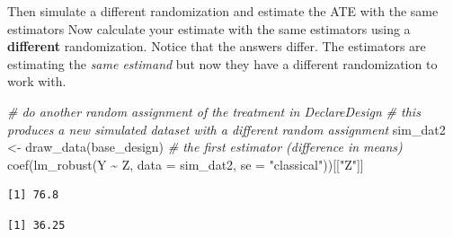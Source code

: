 \documentclass[
  ignorenonframetext,
]{beamer}
\newenvironment{Shaded}{\begin{snugshade}}{\end{snugshade}}
\newcommand{\AttributeTok}[1]{\textcolor[rgb]{0.77,0.63,0.00}{#1}}
\newcommand{\CommentTok}[1]{\textcolor[rgb]{0.56,0.35,0.01}{\textit{#1}}}
\newcommand{\DecValTok}[1]{\textcolor[rgb]{0.00,0.00,0.81}{#1}}
\newcommand{\FunctionTok}[1]{\textcolor[rgb]{0.00,0.00,0.00}{#1}}
\newcommand{\NormalTok}[1]{#1}
\newcommand{\OtherTok}[1]{\textcolor[rgb]{0.56,0.35,0.01}{#1}}
\newcommand{\SpecialCharTok}[1]{\textcolor[rgb]{0.00,0.00,0.00}{#1}}
\newcommand{\StringTok}[1]{\textcolor[rgb]{0.31,0.60,0.02}{#1}}
\begin{document}
\begin{frame}[fragile]{Then simulate a different randomization and
estimate the ATE with the same estimators}
\protect\hypertarget{then-simulate-a-different-randomization-and-estimate-the-ate-with-the-same-estimators}{}
Now calculate your estimate with the same estimators using a
\textbf{different} randomization. Notice that the answers differ. The
estimators are estimating the \emph{same estimand} but now they have a
different randomization to work with.

\scriptsize

\begin{Shaded}
\begin{Highlighting}[]
\CommentTok{\# do another random assignment of the treatment in DeclareDesign}
\CommentTok{\# this produces a new simulated dataset with a different random assignment}
\NormalTok{sim\_dat2 }\OtherTok{\textless{}{-}} \FunctionTok{draw\_data}\NormalTok{(base\_design)}
\CommentTok{\# the first estimator (difference in means)}
\FunctionTok{coef}\NormalTok{(}\FunctionTok{lm\_robust}\NormalTok{(Y }\SpecialCharTok{\textasciitilde{}}\NormalTok{ Z, }\AttributeTok{data =}\NormalTok{ sim\_dat2, }\AttributeTok{se =} \StringTok{"classical"}\NormalTok{))[[}\StringTok{"Z"}\NormalTok{]]}
\end{Highlighting}
\end{Shaded}

\begin{verbatim}
[1] 76.8
\end{verbatim}

\begin{Shaded}
\end{Shaded}

\begin{verbatim}
[1] 36.25
\end{verbatim}

\normalsize
\end{frame}
\end{document}
